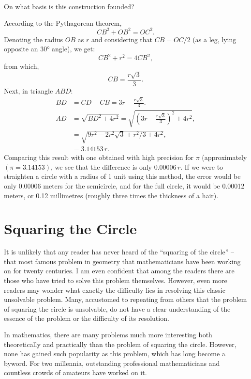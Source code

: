 On what basis is this construction founded?

\ans According to the Pythagorean theorem, 
\begin{equation*}%
CB^{2} + OB^{2} = OC^{2}.
\end{equation*}
Denoting the radius $OB$ as $r$ and considering that $CB = OC/2$ (as a leg, lying opposite an \ang{30} angle), we get: 
\begin{equation*}%
CB^{2} + r^{2} = 4CB^{2}, 
\end{equation*}
from which,
\begin{equation*}%
CB = \frac{r \sqrt{3}}{3}.
\end{equation*}
Next, in triangle $ABD$:
\begin{align*}%
BD & =  CD - CB = 3r - \frac{r\sqrt{3}}{3}.\\
AD & = \sqrt{BD^{2} + 4r^{2}} = \sqrt{\left( 3r - \frac{r \sqrt{3}}{3} \right)^{2} + 4r^{2}}, \\
& = \sqrt{9r^{2} - 2r^{2}\sqrt{3} + r^{2}/3 + 4r^{2}}, \\
& = 3.14153\, r.
\end{align*}
Comparing this result with one obtained with high precision for $\pi$ (approximately $( \pi = 3.14153)$, we see that the difference is only $0.00006\, r$. If we were to straighten a circle with a radius of 1 unit using this method, the error would be only 0.00006 meters for the semicircle, and for the full circle, it would be 0.00012 meters, or 0.12 millimetres (roughly three times the thickness of a hair).


\section{Squaring the Circle}
\label{sec-9.6}

It is unlikely that any reader has never heard of the ``squaring of the circle'' -- that most famous problem in geometry that mathematicians have been working on for twenty centuries. I am even confident that among the readers there are those who have tried to solve this problem themselves. However, even more readers may wonder what exactly the difficulty lies in resolving this classic unsolvable problem. Many, accustomed to repeating from others that the problem of squaring the circle is unsolvable, do not have a clear understanding of the essence of the problem or the difficulty of its resolution.

In mathematics, there are many problems much more interesting both theoretically and practically than the problem of squaring the circle. However, none has gained such popularity as this problem, which has long become a byword. For two millennia, outstanding professional mathematicians and countless crowds of amateurs have worked on it.

